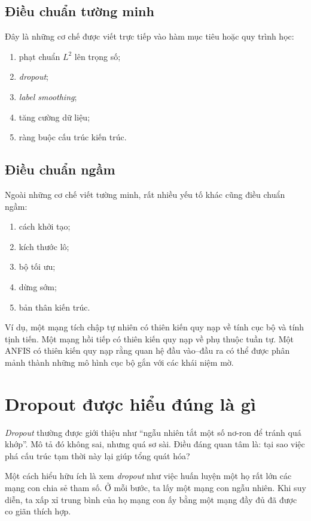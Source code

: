 \subsection{Điều chuẩn tường minh}

Đây là những cơ chế được viết trực tiếp vào hàm mục tiêu hoặc quy trình học:

\begin{enumerate}
\item phạt chuẩn \(L^2\) lên trọng số;
\item \emph{dropout};
\item \emph{label smoothing};
\item tăng cường dữ liệu;
\item ràng buộc cấu trúc kiến trúc.
\end{enumerate}

\subsection{Điều chuẩn ngầm}

Ngoài những cơ chế viết tường minh, rất nhiều yếu tố khác cũng điều chuẩn ngầm:

\begin{enumerate}
\item cách khởi tạo;
\item kích thước lô;
\item bộ tối ưu;
\item dừng sớm;
\item bản thân kiến trúc.
\end{enumerate}

Ví dụ, một mạng tích chập tự nhiên có thiên kiến quy nạp về tính cục bộ và tính tịnh tiến. Một mạng hồi tiếp có thiên kiến quy nạp về phụ thuộc tuần tự. Một ANFIS có thiên kiến quy nạp rằng quan hệ đầu vào--đầu ra có thể được phân mảnh thành những mô hình cục bộ gắn với các khái niệm mờ.

\section{Dropout được hiểu đúng là gì}

\emph{Dropout} thường được giới thiệu như ``ngẫu nhiên tắt một số nơ-ron để tránh quá khớp''. Mô tả đó không sai, nhưng quá sơ sài. Điều đáng quan tâm là: tại sao việc phá cấu trúc tạm thời này lại giúp tổng quát hóa?

Một cách hiểu hữu ích là xem \emph{dropout} như việc huấn luyện một họ rất lớn các mạng con chia sẻ tham số. Ở mỗi bước, ta lấy một mạng con ngẫu nhiên. Khi suy diễn, ta xấp xỉ trung bình của họ mạng con ấy bằng một mạng đầy đủ đã được co giãn thích hợp.

